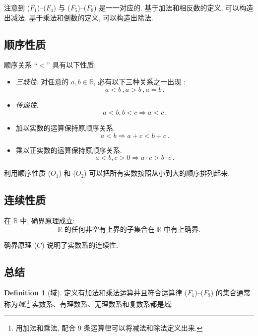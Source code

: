 \documentclass{book}
\newcommand{\R}{\mathbb{R}}
\numberwithin{equation}{section}
\numberwithin{figure}{section}
\theoremstyle{definition}
\newtheorem{definition}{Definition}
\newcommand{\dq}[1]{``#1''}
\begin{document}
注意到 ($F_1$)--($F_4$) 与 ($F_5$)--($F_8$) 是一一对应的.
基于加法和相反数的定义, 可以构造出减法.
基于乘法和倒数的定义, 可以构造出除法.

\subsection{顺序性质}
顺序关系 \dq{$<$} 具有以下性质:
\begin{itemize}
  \item \emph{三歧性}. 对任意的 $a,b\in\R$, 必有以下三种关系之一出现 :
    \begin{equation*}
      a<b\,,a>b\,,a=b\,.\tag{$O_1$}
    \end{equation*}
  \item \emph{传递性}.
    \begin{equation*}
      a<b,b<c\Rightarrow a<c\,.\tag{$O_2$}
    \end{equation*}
  \item 加以实数的运算保持原顺序关系.
    \begin{equation*}
      a<b\Rightarrow a+c<b+c\,.\tag{$O_3$}
    \end{equation*}
  \item 乘以正实数的运算保持原顺序关系.
    \begin{equation*}
      a<b,c>0\Rightarrow a\cdot c>b\cdot c\,.\tag{$O_4$}
    \end{equation*}
\end{itemize}

利用顺序性质 ($O_1$) 和 ($O_2$) 可以把所有实数按照从小到大的顺序排列起来.

\subsection{连续性质}
在 $\R$ 中, 确界原理成立:
\begin{equation*}
  \text{$\R$ 的任何非空有上界的子集合在 $\R$ 中有上确界.}\tag{$C$}
\end{equation*}

确界原理 ($C$) 说明了实数系的连续性.
\subsection{总结}
\begin{definition}[域]
  定义有加法和乘法运算并且符合运算律 ($F_1$)--($F_9$) 的集合通常称为\emph{域}.\footnote{用加法和乘法, 配合 9 条运算律可以将减法和除法定义出来.} 实数系、有理数系、无理数系和复数系都是域.
\end{definition}
\end{document}
